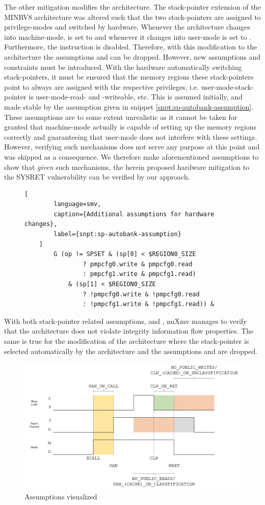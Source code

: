 The other mitigation modifies the architecture.
The stack-pointer extension of the MINRV8 architecture was altered such that the two stack-pointers are assigned to privilege-modes and switched by hardware.
Whenever the architecture changes into machine-mode,  is set to  and whenever it changes into user-mode  is set to .
Furthermore, the  instruction is disabled.
Therefore, with this modification to the architecture the assumptions  and  can be dropped.
However, new assumptions and  constraints must be introduced.
With the hardware automatically switching stack-pointers, it must be ensured that the memory regions these stack-pointers point to always are assigned with the respective privileges, i.e. user-mode-stack-pointer is user-mode-read- and -writeable, etc.
This is assumed initially, and made stable by the assumption given in snippet \ref{snpt:sp-autobank-assumption}.
These assumptions are to some extent unrealistic as it cannot be taken for granted that machine-mode actually is capable of setting up the memory regions correctly and guaranteeing that user-mode does not interfere with these settings.
However, verifying such mechanisms does not serve any purpose at this point and was skipped as a consequence.
We therefore make aforementioned assumptions to show that \textit{given} such mechanisms, the herein proposed hardware mitigation to the SYSRET vulnerability can be verified by our approach.

\begin{figure}
    \begin{lstlisting}[
        language=smv,
        caption={Additional assumptions for hardware changes},
        label={snpt:sp-autobank-assumption}
    ]
        G (op != SPSET & (sp[0] < $REGION0_SIZE
                ? pmpcfg0.write & pmpcfg0.read
                : pmpcfg1.write & pmpcfg1.read)
            & (sp[1] < $REGION0_SIZE
                ? !pmpcfg0.write & !pmpcfg0.read
                : !pmpcfg1.write & !pmpcfg1.read)) &
    \end{lstlisting}
\end{figure}

With both stack-pointer related assumptions,  and , nuXmv manages to verify that the architecture does not violate integrity information flow properties.
The same is true for the modification of the architecture where the stack-pointer is selected automatically by the architecture and the assumptions  and  are dropped.


\begin{figure}
    \centering
    \includegraphics[width=\textwidth]{figures/assumptions.png}
    \caption{Assumptions visualized}
\end{figure}
